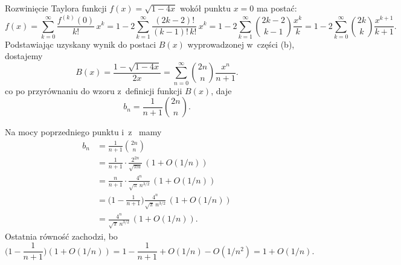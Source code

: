 Rozwinięcie Taylora funkcji $f(x)=\sqrt{1-4x}$ wokół punktu $x=0$ ma postać:
\[
	f(x) = \sum_{k=0}^\infty\frac{f^{(k)}(0)}{k!}\,x^k = 1-2\sum_{k=1}^\infty\frac{(2k-2)!}{(k-1)!\,k!}\,x^k = 1-2\sum_{k=1}^\infty\binom{2k-2}{k-1}\frac{x^k}{k} = 1-2\sum_{k=0}^\infty\binom{2k}{k}\frac{x^{k+1}}{k+1}.
\]
Podstawiając uzyskany wynik do postaci $B(x)$ wyprowadzonej w~części (b), dostajemy
\[
	B(x) = \frac{1-\sqrt{1-4x}}{2x} = \sum_{n=0}^\infty\binom{2n}{n}\frac{x^n}{n+1}.
\]
co po przyrównaniu do wzoru z~definicji funkcji $B(x)$, daje
\[
	b_n = \frac{1}{n+1}\binom{2n}{n}.
\]

\subproblem %
Na mocy poprzedniego punktu i~z~ mamy
\begin{align*}
	b_n &= \frac{1}{n+1}\binom{2n}{n} \\
	&= \frac{1}{n+1}\cdot\frac{2^{2n}}{\sqrt{\pi n}}\,(1+O(1/n)) \\
	&= \frac{n}{n+1}\cdot\frac{4^n}{\sqrt{\pi}\,n^{3/2}}\,(1+O(1/n)) \\
	&= \biggl(1-\frac{1}{n+1}\biggr)\frac{4^n}{\sqrt{\pi}\,n^{3/2}}\,(1+O(1/n)) \\
	&= \frac{4^n}{\sqrt{\pi}\,n^{3/2}}\,(1+O(1/n)).
\end{align*}
Ostatnia równość zachodzi, bo
\[
	\biggl(1-\frac{1}{n+1}\biggr)(1+O(1/n)) = 1-\frac{1}{n+1}+O(1/n)-O(1/n^2) = 1+O(1/n).
\]
